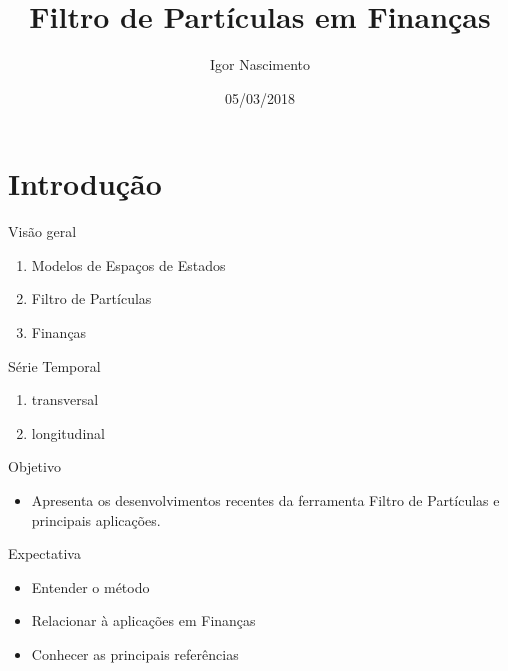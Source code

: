 \documentclass{beamer}
\title[Artigo]{Filtro de Partículas em Finanças}
\author[Igor Nascimento]{Igor Nascimento}
\institute[LAMFO]{Laboratório de Aprendizado de Máquina em Finanças e Organizações}
\date[2018]{05/03/2018}
\begin{document}
\begin{frame}
  \titlepage
\end{frame}

\section{Introdução}

\begin{frame}{Visão geral}


\vspace{.15cm}
\begin{enumerate}
\item Modelos de Espaços de Estados
\vspace{.15cm}
\item Filtro de Partículas
\vspace{.15cm}
\item Finanças
\end{enumerate}

\end{frame}

\begin{frame}{Série Temporal}


\begin{enumerate}
\item transversal
\item longitudinal
\end{enumerate}

\end{frame}

\begin{frame}{Objetivo}

\begin{itemize}
\item Apresenta os desenvolvimentos recentes da ferramenta Filtro de Partículas e principais aplicações.
\end{itemize}

\end{frame}

\begin{frame}{Expectativa}

\begin{itemize}
\item Entender o método
\item Relacionar à aplicações em Finanças
\item Conhecer as principais referências
\end{itemize}

\end{frame}
\end{document}

